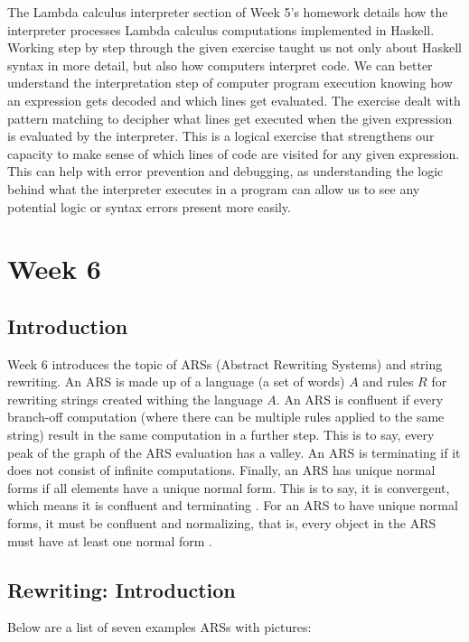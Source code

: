 \documentclass{article}
\theoremstyle{theorem}
\theoremstyle{definition}
\theoremstyle{remark}
\begin{document}
The Lambda calculus interpreter section of Week 5's homework details how the interpreter processes Lambda calculus computations implemented in Haskell. Working step by step through the given exercise taught us not only about Haskell syntax in more detail, but also how computers interpret code. We can better understand the interpretation step of computer program execution knowing how an expression gets decoded and which lines get evaluated. The exercise dealt with pattern matching to decipher what lines get executed when the given expression is evaluated by the interpreter. This is a logical exercise that strengthens our capacity to make sense of which lines of code are visited for any given expression. This can help with error prevention and debugging, as understanding the logic behind what the interpreter executes in a program can allow us to see any potential logic or syntax errors present more easily. 

\section{Week 6}

\subsection{Introduction}

Week 6 introduces the topic of ARSs (Abstract Rewriting Systems) and string rewriting. An ARS is made up of a language (a set of words) $A$ and rules $R$ for rewriting strings created withing the language $A$. An ARS is confluent if every branch-off computation (where there can be multiple rules applied to the same string) result in the same computation in a further step. This is to say, every peak of the graph of the ARS evaluation has a valley. An ARS is terminating if it does not consist of infinite computations. Finally, an ARS has unique normal forms if all elements have a unique normal form. This is to say, it is convergent, which means it is confluent and terminating \cite{Ars}. For an ARS to have unique normal forms, it must be confluent and normalizing, that is, every object in the ARS must have at least one normal form \cite{Ars}. 

\subsection{Rewriting: Introduction}

Below are a list of seven examples ARSs with pictures:
\end{document}
